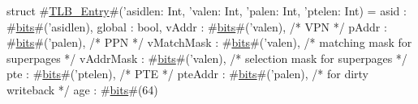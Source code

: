 struct #\hyperref[sailRISCVzTLBzyEntry]{TLB\_Entry}#('asidlen: Int, 'valen: Int, 'palen: Int, 'ptelen: Int) = {
  asid : #\hyperref[sailRISCVzbits]{bits}#('asidlen),
  global : bool,
  vAddr : #\hyperref[sailRISCVzbits]{bits}#('valen),      /* VPN */
  pAddr : #\hyperref[sailRISCVzbits]{bits}#('palen),      /* PPN */
  vMatchMask : #\hyperref[sailRISCVzbits]{bits}#('valen), /* matching mask for superpages */
  vAddrMask  : #\hyperref[sailRISCVzbits]{bits}#('valen), /* selection mask for superpages */
  pte : #\hyperref[sailRISCVzbits]{bits}#('ptelen),       /* PTE */
  pteAddr : #\hyperref[sailRISCVzbits]{bits}#('palen),    /* for dirty writeback */
  age : #\hyperref[sailRISCVzbits]{bits}#(64)
}
